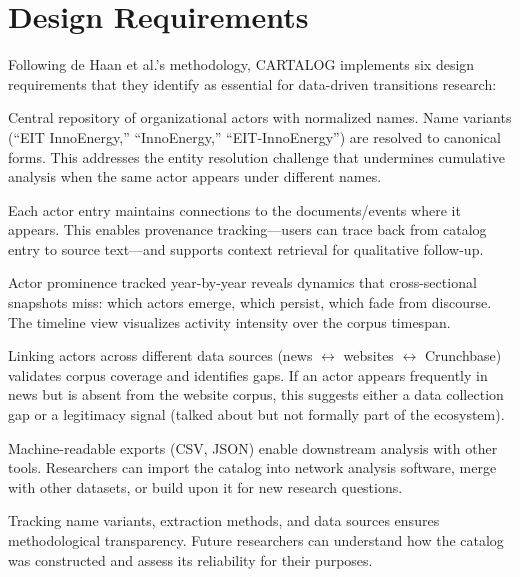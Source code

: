 \documentclass[../main.tex]{subfiles}
\begin{document}
\section{Design Requirements}
\label{sec:cartalog-design}

Following de Haan et al.'s methodology, \textsc{CARTALOG} implements six design requirements that they identify as essential for data-driven transitions research:

\begin{description}[leftmargin=0.5cm, itemsep=0.4em]

\item[1. Actor Catalog] Central repository of organizational actors with normalized names. Name variants (``EIT InnoEnergy,'' ``InnoEnergy,'' ``EIT-InnoEnergy'') are resolved to canonical forms. This addresses the entity resolution challenge that undermines cumulative analysis when the same actor appears under different names.

\item[2. Event-Actor Linkage] Each actor entry maintains connections to the documents/events where it appears. This enables provenance tracking---users can trace back from catalog entry to source text---and supports context retrieval for qualitative follow-up.

\item[3. Temporal Tracking] Actor prominence tracked year-by-year reveals dynamics that cross-sectional snapshots miss: which actors emerge, which persist, which fade from discourse. The timeline view visualizes activity intensity over the corpus timespan.

\item[4. Cross-Corpus Validation] Linking actors across different data sources (news $\leftrightarrow$ websites $\leftrightarrow$ Crunchbase) validates corpus coverage and identifies gaps. If an actor appears frequently in news but is absent from the website corpus, this suggests either a data collection gap or a legitimacy signal (talked about but not formally part of the ecosystem).

\item[5. Export/Interoperability] Machine-readable exports (CSV, JSON) enable downstream analysis with other tools. Researchers can import the catalog into network analysis software, merge with other datasets, or build upon it for new research questions.

\item[6. Provenance] Tracking name variants, extraction methods, and data sources ensures methodological transparency. Future researchers can understand how the catalog was constructed and assess its reliability for their purposes.

\end{description}
\end{document}
